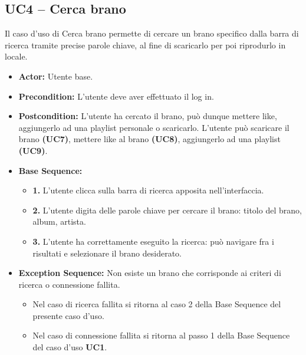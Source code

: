 \subsection{UC4 -- Cerca brano}
Il caso d'uso di Cerca brano permette di cercare un brano specifico dalla barra di ricerca
tramite precise parole chiave, al fine di scaricarlo per poi riprodurlo in locale.
\begin{itemize}
    \item \textbf{Actor:} Utente base.
    \item \textbf{Precondition:} L'utente deve aver effettuato il log in.
    \item \textbf{Postcondition:} L'utente ha cercato il brano, può dunque mettere like, 
    aggiungerlo ad una playlist personale o scaricarlo. L'utente può scaricare il brano 
    \textbf{(UC7)}, mettere like al brano \textbf{(UC8)}, aggiungerlo ad una playlist \textbf{(UC9)}.
    \item \textbf{Base Sequence:}
    \begin{itemize}
        \item \textbf{1.} L'utente clicca sulla barra di ricerca apposita nell'interfaccia.
        \item \textbf{2.} L'utente digita delle parole chiave per cercare il brano: titolo del brano, album, artista.
        \item \textbf{3.} L'utente ha correttamente eseguito la ricerca: può navigare fra i risultati e selezionare il brano desiderato.
    \end{itemize}
    \item \textbf{Exception Sequence:} Non esiste un brano che corrisponde ai criteri di ricerca o connessione fallita.
    \begin{itemize}
        \item Nel caso di ricerca fallita si ritorna al caso 2 della Base Sequence del presente caso d'uso.
        \item Nel caso di connessione fallita si ritorna al passo 1 della Base Sequence del caso d'uso \textbf{UC1}.
    \end{itemize}
\end{itemize}
\vspace{1cm}

